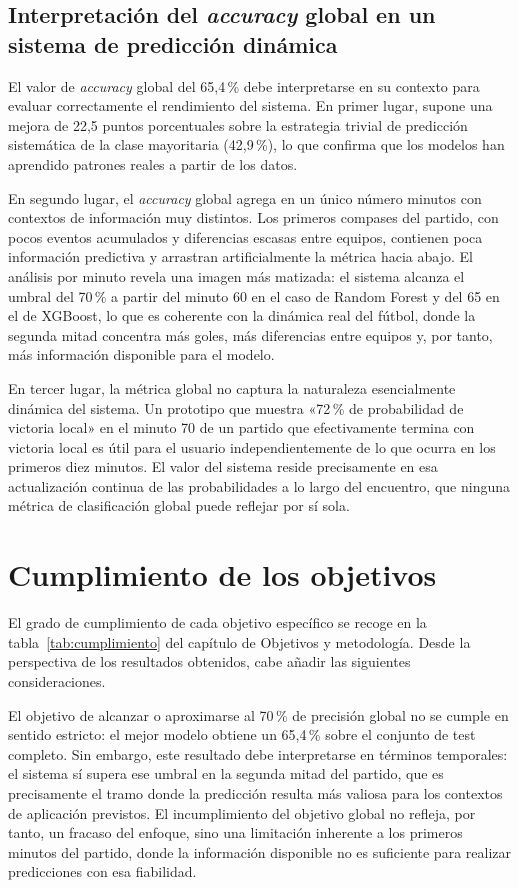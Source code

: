 \subsection{Interpretación del \textit{accuracy} global en un sistema de predicción dinámica}

El valor de \textit{accuracy} global del 65,4\,\% debe interpretarse en su contexto para evaluar correctamente el rendimiento del sistema. En primer lugar, supone una mejora de 22,5 puntos porcentuales sobre la estrategia trivial de predicción sistemática de la clase mayoritaria (42,9\,\%), lo que confirma que los modelos han aprendido patrones reales a partir de los datos.

En segundo lugar, el \textit{accuracy} global agrega en un único número minutos con contextos de información muy distintos. Los primeros compases del partido, con pocos eventos acumulados y diferencias escasas entre equipos, contienen poca información predictiva y arrastran artificialmente la métrica hacia abajo. El análisis por minuto revela una imagen más matizada: el sistema alcanza el umbral del 70\,\% a partir del minuto 60 en el caso de Random Forest y del 65 en el de XGBoost, lo que es coherente con la dinámica real del fútbol, donde la segunda mitad concentra más goles, más diferencias entre equipos y, por tanto, más información disponible para el modelo.

En tercer lugar, la métrica global no captura la naturaleza esencialmente dinámica del sistema. Un prototipo que muestra «72\,\% de probabilidad de victoria local» en el minuto 70 de un partido que efectivamente termina con victoria local es útil para el usuario independientemente de lo que ocurra en los primeros diez minutos. El valor del sistema reside precisamente en esa actualización continua de las probabilidades a lo largo del encuentro, que ninguna métrica de clasificación global puede reflejar por sí sola.

\section{Cumplimiento de los objetivos}

El grado de cumplimiento de cada objetivo específico se recoge en la tabla~\ref{tab:cumplimiento} del capítulo de Objetivos y metodología. Desde la perspectiva de los resultados obtenidos, cabe añadir las siguientes consideraciones.

El objetivo de alcanzar o aproximarse al 70\,\% de precisión global no se cumple en sentido estricto: el mejor modelo obtiene un 65,4\,\% sobre el conjunto de test completo. Sin embargo, este resultado debe interpretarse en términos temporales: el sistema sí supera ese umbral en la segunda mitad del partido, que es precisamente el tramo donde la predicción resulta más valiosa para los contextos de aplicación previstos. El incumplimiento del objetivo global no refleja, por tanto, un fracaso del enfoque, sino una limitación inherente a los primeros minutos del partido, donde la información disponible no es suficiente para realizar predicciones con esa fiabilidad.

